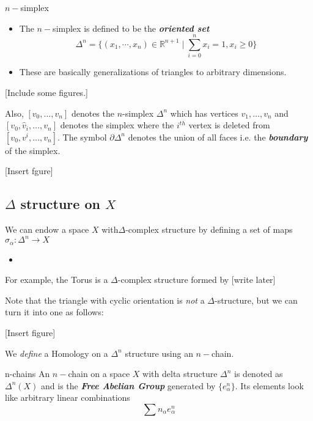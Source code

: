\documentclass{article}
\newcommand{\R}{\mathbb{R}}
\begin{document}
\begin{mathdefinitionbox}{$n-$simplex}
\begin{itemize}
  \item   The $n-$simplex is defined to be the \emph{\textbf{oriented set}} 
  \[ \Delta^n = \{ \left(x_1, \cdots, x_n\right) \in \R^{n+1} \;|\; \sum_{i = 0}^{n} x_i = 1, x_i \geq 0 \} \] 

  \item These are basically generalizations of triangles to arbitrary dimensions.
\end{itemize}
\end{mathdefinitionbox}

[Include some figures.]

\vskip 0.5cm
Also, $[v_0, \dots, v_n]$ denotes the $n$-simplex $\Delta^n$ which has vertices $v_1, \dots, v_n$ and $[v_0, \hat{v}_i,\dots, v_n]$ denotes the simplex where the $i^{th}$ vertex is deleted from $[v_0, v^i, \dots, v_n]$. The symbol $\partial \Delta^n$ denotes the union of all faces i.e. the \emph{\textbf{boundary}} of the simplex.

\vskip 0.5cm
[Insert fgure]

\vskip 0.5cm
\subsection*{$\Delta$ structure on $X$}

\vskip 0.5cm
\begin{mathdefinitionbox}{}
  We can endow a space $X$ with$\Delta$-complex structure by defining a set of maps $\sigma_{\alpha} : \Delta^n \rightarrow X$ 
  \begin{itemize}
    \item 
  \end{itemize}
\end{mathdefinitionbox}

\vskip 0.5cm
For example, the Torus is a $\Delta$-complex structure formed by [write later]

\vskip 0.5cm
Note that the triangle with cyclic orientation is \emph{not} a $\Delta$-structure, but we can turn it into one as follows:

\vskip 0.5cm
[Insert figure]

\vskip 0.5cm
We \emph{define} a Homology on a $\Delta^n$ structure using an $n-$chain.

\begin{mathdefinitionbox}{n-chains}
  An $n-$chain on a space $X$ with delta structure $\Delta^n$ is denoted as $\Delta^n(X)$ and is the \emph{\textbf{Free Abelian Group}} generated by $\{e^n_{\alpha}\}$. Its elements look like arbitrary linear combinations
  \[ \sum n_{\alpha} e^n_{\alpha} \]
\end{mathdefinitionbox}
\end{document}
